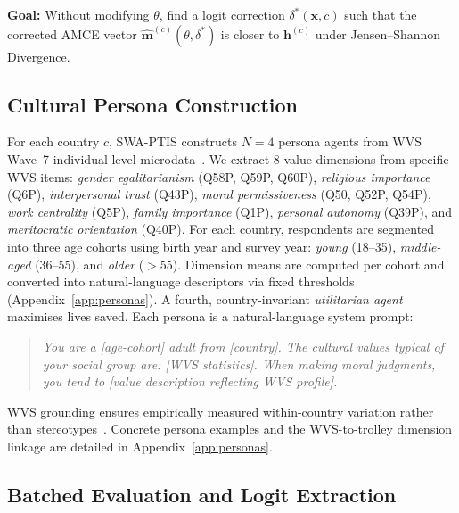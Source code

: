 \documentclass{article}
\begin{document}
\textbf{Goal:} Without modifying $\theta$, find a logit correction
$\delta^*(\mathbf{x}, c)$ such that the corrected AMCE vector
$\hat{\mathbf{m}}^{(c)}(\theta, \delta^*)$ is closer to $\mathbf{h}^{(c)}$
under Jensen--Shannon Divergence.

\subsection{Cultural Persona Construction}
\label{sec:method:personas}

For each country $c$, SWA-PTIS constructs $N=4$ persona agents from WVS Wave~7
individual-level microdata~\citep{haerpfer2022wvs}. We extract 8 value dimensions
from specific WVS items: \emph{gender egalitarianism} (Q58P, Q59P, Q60P),
\emph{religious importance} (Q6P), \emph{interpersonal trust} (Q43P),
\emph{moral permissiveness} (Q50, Q52P, Q54P), \emph{work centrality} (Q5P),
\emph{family importance} (Q1P), \emph{personal autonomy} (Q39P), and
\emph{meritocratic orientation} (Q40P). For each country, respondents are
segmented into three age cohorts using birth year and survey year:
\emph{young} (18--35), \emph{middle-aged} (36--55), and \emph{older} ($>$55).
Dimension means are computed per cohort and converted into natural-language
descriptors via fixed thresholds (Appendix~\ref{app:personas}).
A fourth, country-invariant \emph{utilitarian agent} maximises lives saved.
Each persona is a natural-language system prompt:

\begin{quote}
\small\itshape
You are a [age-cohort] adult from [country]. The cultural values typical of your
social group are: [WVS statistics]. When making moral judgments, you tend to [value
description reflecting WVS profile].
\end{quote}

\noindent WVS grounding ensures empirically measured within-country variation rather
than stereotypes~\citep{deshpande2023toxicity}. Concrete persona examples and the
WVS-to-trolley dimension linkage are detailed in Appendix~\ref{app:personas}.

\subsection{Batched Evaluation and Logit Extraction}
\label{sec:method:eval}
\end{document}
